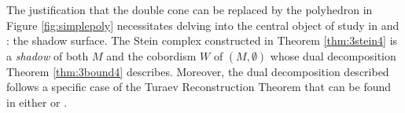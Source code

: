 												\begin{rmk}
													The justification that the double cone can be replaced by the polyhedron in Figure \ref{fig:simplepoly} necessitates delving into the central object of study in \cite{CostThur08} and \cite{Turaev91}: the shadow surface.
													The Stein complex constructed in Theorem \ref{thm:3stein4} is a \emph{shadow} of both $M$ and the cobordism $W$ of $(M,\emptyset)$ whose dual decomposition Theorem \ref{thm:3bound4} describes.
													Moreover, the dual decomposition described follows a specific case of the Turaev Reconstruction Theorem that can be found in either \cite{CostThur08} or \cite{Turaev91}.
												\end{rmk}
